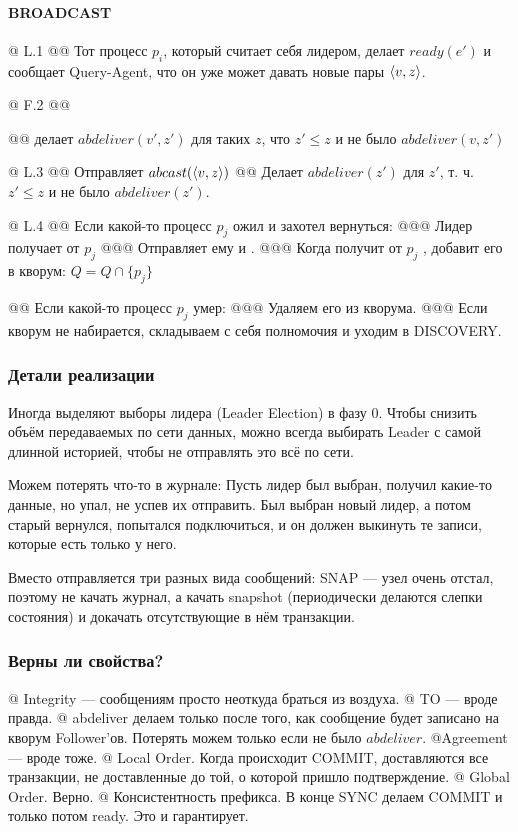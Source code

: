 \paragraph{BROADCAST}
\begin{el}[ul]
@ L.1 
@@ Тот процесс $p_i$, который считает себя лидером, делает $ready(e')$ и сообщает Query-Agent, что он уже может давать новые пары $\langle v, z\rangle$.

@ F.2
@@ 

@@ делает $abdeliver(v', z')$ для таких $z$, что $z' \le z$ и не было $abdeliver(v, z')$

@ L.3
@@ Отправляет $abcast(\langle v, z\rangle)$
@@ Делает $abdeliver(z')$ для $z'$, т. ч. $z' \le z$ и не было $abdeliver(z')$.

@ L.4 
@@ Если какой-то процесс $p_j$ ожил и захотел вернуться:
@@@ Лидер получает от $p_j$ 
@@@ Отправляет ему  и .
@@@ Когда получит от $p_j$ , добавит его в кворум: $Q = Q \cap \{p_j\}$

@@ Если какой-то процесс $p_j$ умер:
@@@ Удаляем его из кворума.
@@@ Если кворум не набирается, складываем с себя полномочия и уходим в DISCOVERY.
\end{el}

\subsubsection{Детали реализации}
Иногда выделяют выборы лидера (Leader Election) в фазу 0.
Чтобы снизить объём передаваемых по сети данных, можно всегда выбирать Leader с самой длинной историей, чтобы не отправлять это всё по сети.

Можем потерять что-то в журнале: 
Пусть лидер был выбран, получил какие-то данные, но упал, не успев их отправить. Был выбран новый лидер, а потом старый вернулся, попытался подключиться, и он должен выкинуть те записи, которые есть только у него.

Вместо  отправляется три разных вида сообщений:
SNAP --- узел очень отстал, поэтому не качать журнал, а качать snapshot (периодически делаются слепки состояния) и докачать отсутствующие в нём транзакции.

\subsubsection{Верны ли свойства?}
\begin{el}[ul]
@ Integrity --- сообщениям просто неоткуда браться из воздуха.
@ TO --- вроде правда.
@ abdeliver делаем только после того, как сообщение будет записано на кворум Follower'ов. Потерять можем только если не было $abdeliver$.
@Agreement --- вроде тоже.
@ Local Order. Когда происходит COMMIT, доставляются все транзакции, не доставленные до той, о которой пришло подтверждение.
@ Global Order. Верно.
@ Консистентность префикса.
В конце SYNC делаем COMMIT и только потом ready. Это и гарантирует. 
\end{el}

